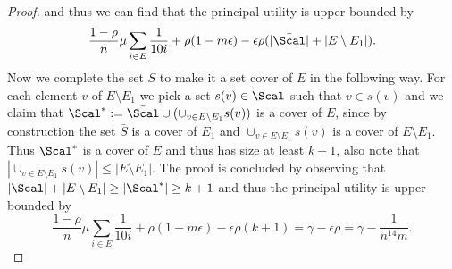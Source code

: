 \begin{proof}
	and thus we can find that the principal utility is upper bounded by
	\[
	\frac{1-\rho}{n}\mu\sum_{i\in E}\frac{1}{10i}+\rho(1-m\epsilon)-\epsilon\rho(|\bar\Scal|+|E\setminus E_1|).
	\]
	Now we complete the set $\bar S$ to make it a set cover of $E$ in the following way. For each element $v$ of $E\setminus E_1$ we pick a set $s(v)\in\Scal$ such that $v\in s(v)$ and we claim that $\Scal^*:=\bar\Scal\cup( \cup_{v\in E\setminus E_1}s(v))$ is a cover of $E$, since by construction the set $\bar S$ is a cover of $E_1$ and $\cup_{v\in E\setminus E_1}s(v)$ is a cover of $E\setminus E_1$. Thus $\Scal^*$ is a cover of $E$ and thus has size at least $k+1$, also note that $|\cup_{v\in E\setminus E_1}s(v)|\le |E\setminus E_1|$. The proof is concluded by observing that $|\bar \Scal|+|E\setminus E_1|\ge |\Scal^*|\ge k+1$ and thus the principal utility is upper bounded by
	\[
	\frac{1-\rho}{n}\mu\sum_{i\in E}\frac{1}{10i}+\rho(1-m\epsilon)-\epsilon\rho(k+1)=\gamma-\epsilon\rho=\gamma-\frac{1}{n^{14}m}.
	\]
	

\end{proof}
